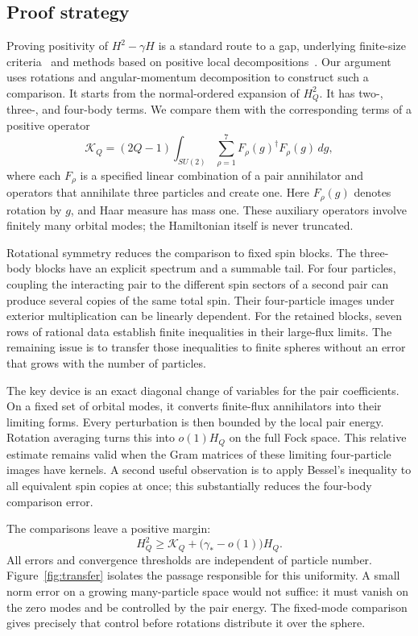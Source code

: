 \subsection{Proof strategy}
Proving positivity of $H^2-\gamma H$ is a standard route to a gap,
underlying finite-size criteria~\cite{Knabe} and methods based on positive
local decompositions~\cite{Cruz,Rai}. Our argument uses rotations and
angular-momentum decomposition to construct such a comparison.
It starts from the normal-ordered expansion of \(H_Q^2\).
It has two-, three-, and four-body terms. We compare them with the
corresponding terms of a positive operator
\[
 \mathcal K_Q=(2Q-1)\int_{SU(2)}
                  \sum_{\rho=1}^{7}F_\rho(g)^\dagger F_\rho(g)\,dg,
\]
where each \(F_\rho\) is a specified linear combination of a pair
annihilator and operators that annihilate three particles and create one.
Here \(F_\rho(g)\) denotes rotation by \(g\), and Haar measure has mass
one. These auxiliary operators involve finitely many orbital modes;
the Hamiltonian itself is never truncated.

Rotational symmetry reduces the comparison to fixed spin blocks.
The three-body blocks have an explicit spectrum and a summable tail.
For four particles, coupling the interacting pair to the different spin
sectors of a second pair can produce several copies of the same total spin.
Their four-particle images under exterior multiplication can be linearly
dependent.
For the retained blocks, seven rows of rational data establish finite
inequalities in their large-flux limits. The remaining issue is to transfer
those inequalities to finite spheres without an error that grows with the
number of particles.

The key device is an exact diagonal change of variables for the pair
coefficients. On a fixed set of orbital modes, it converts finite-flux
annihilators into their limiting forms. Every perturbation is then bounded
by the local pair energy. Rotation averaging turns this into
\(o(1)H_Q\) on the full Fock space. This relative estimate remains valid
when the Gram matrices of these limiting four-particle images have kernels.
A second useful observation
is to apply Bessel's inequality to all equivalent spin copies at once;
this substantially reduces the four-body comparison error.

The comparisons leave a positive margin:
\begin{equation}\label{eq:budget}
 H_Q^2\ge\mathcal K_Q+
       \bigl(\gamma_*-o(1)\bigr)H_Q.
\end{equation}
All errors and convergence
thresholds are independent of particle number.
Figure~\ref{fig:transfer} isolates the passage responsible for this
uniformity. A small norm error on a growing many-particle space would not
suffice: it must vanish on the zero modes and be controlled by the pair
energy. The fixed-mode comparison gives precisely that control before
rotations distribute it over the sphere.

